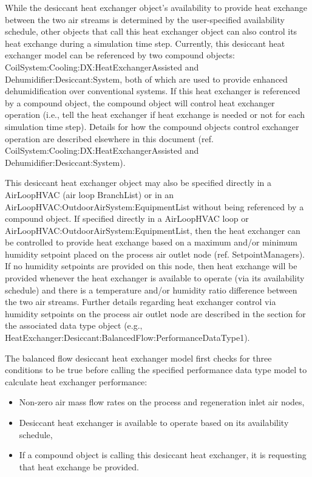 While the desiccant heat exchanger object's availability to provide heat exchange between the two air streams is determined by the user-specified availability schedule, other objects that call this heat exchanger object can also control its heat exchange during a simulation time step. Currently, this desiccant heat exchanger model can be referenced by two compound objects: CoilSystem:Cooling:DX:HeatExchangerAssisted and Dehumidifier:Desiccant:System, both of which are used to provide enhanced dehumidification over conventional systems. If this heat exchanger is referenced by a compound object, the compound object will control heat exchanger operation (i.e., tell the heat exchanger if heat exchange is needed or not for each simulation time step). Details for how the compound objects control exchanger operation are described elsewhere in this document (ref. CoilSystem:Cooling:DX:HeatExchangerAssisted and Dehumidifier:Desiccant:System).

This desiccant heat exchanger object may also be specified directly in a AirLoopHVAC (air loop BranchList) or in an AirLoopHVAC:OutdoorAirSystem:EquipmentList without being referenced by a compound object. If specified directly in a AirLoopHVAC loop or AirLoopHVAC:OutdoorAirSystem:EquipmentList, then the heat exchanger can be controlled to provide heat exchange based on a maximum and/or minimum humidity setpoint placed on the process air outlet node (ref. SetpointManagers). If no humidity setpoints are provided on this node, then heat exchange will be provided whenever the heat exchanger is available to operate (via its availability schedule) and there is a temperature and/or humidity ratio difference between the two air streams. Further details regarding heat exchanger control via humidity setpoints on the process air outlet node are described in the section for the associated data type object (e.g., HeatExchanger:Desiccant:BalancedFlow:PerformanceDataType1).

The balanced flow desiccant heat exchanger model first checks for three conditions to be true before calling the specified performance data type model to calculate heat exchanger performance:

\begin{itemize}
\item Non-zero air mass flow rates on the process and regeneration inlet air nodes,
\item Desiccant heat exchanger is available to operate based on its availability schedule,
\item If a compound object is calling this desiccant heat exchanger, it is requesting that heat exchange be provided.
\end{itemize}

